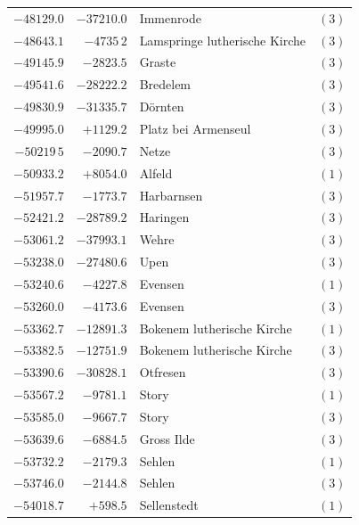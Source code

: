 \begin{center}
\begin{tabular}{r|r|p{170pt}|r}
\(-48129.0\)&\(-37210.0\)&Immenrode&\((3)\)\\
\(-48643.1\)&\(-4735\,2\)&Lamspringe lutherische Kirche&\((3)\)\\
\(-49145.9\)&\(-2823.5\)&Graste&\((3)\)\\
\(-49541.6\)&\(-28222.2\)&Bredelem&\((3)\)\\
\(-49830.9\)&\(-31335.7\)&Dörnten&\((3)\)\\
\(-49995.0\)&\(+1129.2\)&Platz bei Armenseul&\((3)\)\\
\(-50219\,5\)&\(-2090.7\)&Netze&\((3)\)\\
\(-50933.2\)&\(+8054.0\)&Alfeld&\((1)\)\\
\(-51957.7\)&\(-1773.7\)&Harbarnsen&\((3)\)\\
\(-52421.2\)&\(-28789.2\)&Haringen&\((3)\)\\
\(-53061.2\)&\(-37993.1\)&Wehre&\((3)\)\\
\(-53238.0\)&\(-27480.6\)&Upen&\((3)\)\\
\(-53240.6\)&\(-4227.8\)&Evensen&\((1)\)\\
\(-53260.0\)&\(-4173.6\)&Evensen&\((3)\)\\
\(-53362.7\)&\(-12891.3\)&Bokenem lutherische Kirche&\((1)\)\\
\(-53382.5\)&\(-12751.9\)&Bokenem lutherische Kirche&\((3)\)\\
\(-53390.6\)&\(-30828.1\)&Otfresen&\((3)\)\\
\(-53567.2\)&\(-9781.1\)&Story&\((1)\)\\
\(-53585.0\)&\(-9667.7\)&Story&\((3)\)\\
\(-53639.6\)&\(-6884.5\)&Gross Ilde&\((3)\)\\
\(-53732.2\)&\(-2179.3\)&Sehlen&\((1)\)\\
\(-53746.0\)&\(-2144.8\)&Sehlen&\((3)\)\\
\(-54018.7\)&\(+598.5\)&Sellenstedt&\((1)\)\\
\hline\end{tabular}\endgroup\end{center}
\clearpage
